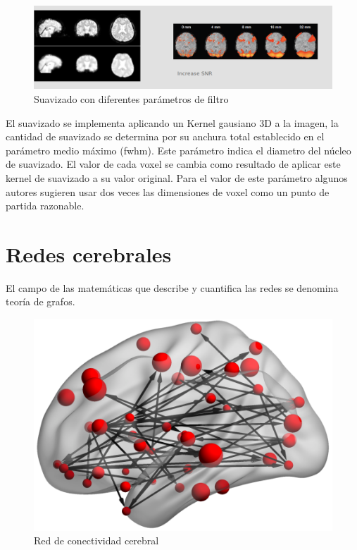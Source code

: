 \begin{figure}[H]
 \centering
    \includegraphics[scale=0.35]{img/smooth.png}
  \caption{Suavizado con diferentes parámetros de filtro}         \label{preproc:smooth}
\end{figure}

El suavizado se implementa aplicando un Kernel gausiano 3D a la imagen, la cantidad de suavizado se determina por su anchura total establecido en el parámetro medio máximo (fwhm). Este parámetro indica el diametro del núcleo de suavizado. El valor de cada voxel se cambia como resultado de aplicar este kernel de suavizado a su valor original. Para el valor de este parámetro algunos autores sugieren usar dos veces las dimensiones de voxel como un punto de partida razonable.\cite{brainhack}


\section{Redes cerebrales}
 
El campo de las matemáticas que describe y cuantifica las redes se denomina teoría de grafos.
 
 \begin{figure}[H]
  \centering
    \includegraphics[scale=0.5]{img/net.png}
  \caption{Red de conectividad cerebral}         \label{preproc:net}
\end{figure}


